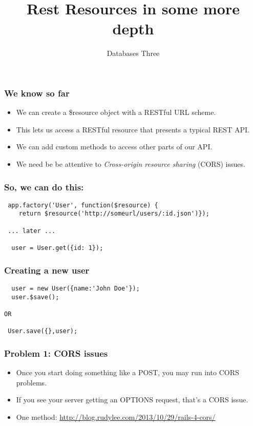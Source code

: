\documentclass[10pt]{beamer}
\title{Rest Resources in some more depth}
\author[IN705]{Databases Three}
\institute[Otago Polytechnic]{
  Otago Polytechnic \\
  Dunedin, New Zealand \\
}
\date{}
\begin{document}
\begin{frame}[plain]
  \titlepage
\end{frame}




\begin{frame}
  \frametitle{We know so far}

 \begin{itemize}
  \item We can create a \$resource object with a RESTful URL scheme.
  \item This lets us access a RESTful resource that presents a typical
        REST API.
  \item We can add custom methods to access other parts of our API.
  \item We need be be attentive to \emph{Cross-origin resource sharing} (CORS) issues.  
 \end{itemize}

\end{frame}


\begin{frame}[fragile]
  \frametitle{So, we can do this:}

 \begin{verbatim}
 app.factory('User', function($resource) {
    return $resource('http://someurl/users/:id.json')});

 ... later ...

  user = User.get({id: 1});

 \end{verbatim}

\end{frame}



\begin{frame}[fragile]
  \frametitle{Creating a new user}

 \begin{verbatim}
  user = new User({name:'John Doe'});
  user.$save();

OR
 
 User.save({},user);
 \end{verbatim}

\end{frame}


\begin{frame}
  \frametitle{Problem 1: CORS issues}

 \begin{itemize}
  \item Once you start doing something like a POST, you may run into CORS problems.
  \item If you see your server getting an OPTIONS request, that's a CORS issue.
  \item One method: \url{http://blog.rudylee.com/2013/10/29/rails-4-cors/}
 \end{itemize}

\end{frame}
\end{document}
